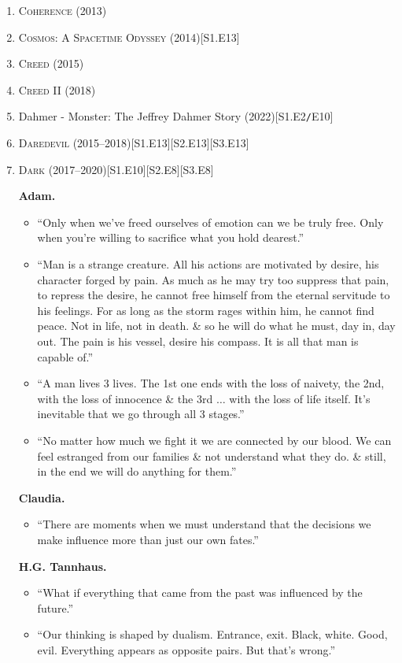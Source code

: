 \documentclass{article}
\begin{document}
\begin{enumerate}
	\item \textsc{Coherence} (2013)
	\item \textsc{Cosmos: A Spacetime Odyssey} (2014)\hfill[S1.E13]
	\item \textsc{Creed} (2015)
	\item \textsc{Creed II} (2018)
	\item Dahmer - Monster: The Jeffrey Dahmer Story (2022)\hfill[S1.E2\texttt{/}E10]
	\item \textsc{Daredevil} (2015--2018)\hfill[S1.E13][S2.E13][S3.E13]
	\item \textsc{Dark} (2017--2020)\hfill[S1.E10][S2.E8][S3.E8]
	
	\textbf{Adam.}
	\begin{itemize}
		\item ``Only when we've freed ourselves of emotion can we be truly free. Only when you're willing to sacrifice what you hold dearest.''
		\item ``Man is a strange creature. All his actions are motivated by desire, his character forged by pain. As much as he may try too suppress that pain, to repress the desire, he cannot free himself from the eternal servitude to his feelings. For as long as the storm rages within him, he cannot find peace. Not in life, not in death. \& so he will do what he must, day in, day out. The pain is his vessel, desire his compass. It is all that man is capable of.''
		\item ``A man lives 3 lives. The 1st one ends with the loss of naivety, the 2nd, with the loss of innocence \& the 3rd $\ldots$ with the loss of life itself. It's inevitable that we go through all 3 stages.''
		\item ``No matter how much we fight it we are connected by our blood. We can feel estranged from our families \& not understand what they do. \& still, in the end we will do anything for them.''
	\end{itemize}
	\textbf{Claudia.}
	\begin{itemize}
		\item ``There are moments when we must understand that the decisions we make influence more than just our own fates.''
	\end{itemize}
	\textbf{H.G. Tannhaus.}
	\begin{itemize}
		\item ``What if everything that came from the past was influenced by the future.''
		\item ``Our thinking is shaped by dualism. Entrance, exit. Black, white. Good, evil. Everything appears as opposite pairs. But that's wrong.''

\end{itemize}
\end{enumerate}
\end{document}
